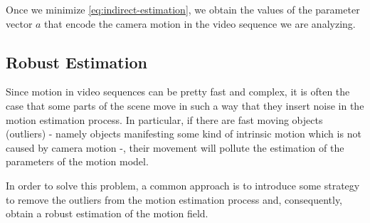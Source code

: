 

Once we minimize \cref{eq:indirect-estimation}, we obtain the values of the parameter vector $a$ that encode the camera motion in the video sequence we are analyzing.

\subsection{Robust Estimation}
Since motion in video sequences can be pretty fast and complex, it is often the case that some parts of the scene move in such a way that they insert noise in the motion estimation process.
In particular, if there are fast moving objects (outliers) - namely objects manifesting some kind of intrinsic motion which is not caused by camera motion -, their movement will pollute the estimation of the parameters of the motion model.

In order to solve this problem, a common approach is to introduce some strategy to remove the outliers from the motion estimation process and, consequently, obtain a robust estimation of the motion field.